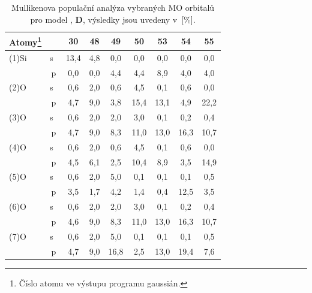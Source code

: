 \documentclass[
digital, %
table,   %
lof,     %
lot,     %
oneside,
]{fithesis3}
\begin{document}
\begin{table}[H]
\begin{minipage}{\textwidth}
\begin{center}
\caption{Mullikenova populační analýza vybraných MO orbitalů pro model , \textbf{D}, výsledky jsou uvedeny v~[\%].}
\begin{tabular}{|l|c|c|c|c|c|c|c|c|}
\hline
Atomy\footnote{Číslo atomu ve výstupu programu gaussián.}  \label{si_och3_6_MPA}&  & 30 & 48 & 49 & 50 & 53 & 54 & 55 \\ \hline
(1)Si & s~& 13,4  & 4,8  & 0,0  & 0,0  & 0,0  & 0,0  & 0,0  \\ \hline
& p & 0,0  & 0,0  & 4,4  & 4,4  & 8,9  & 4,0  & 4,0  \\ \hline
(2)O & s~& 0,6  & 2,0  & 0,6  & 4,5  & 0,1  & 0,6  & 0,0  \\ \hline
& p & 4,7  & 9,0  & 3,8  & 15,4  & 13,1  & 4,9  & 22,2  \\ \hline
(3)O & s~& 0,6  & 2,0  & 2,0  & 3,0  & 0,1  & 0,2  & 0,4  \\ \hline
& p & 4,7  & 9,0  & 8,3  & 11,0  & 13,0  & 16,3  & 10,7  \\ \hline
(4)O & s~& 0,6  & 2,0  & 0,6  & 4,5  & 0,1  & 0,6  & 0,0  \\ \hline
& p & 4,5  & 6,1  & 2,5  & 10,4  & 8,9  & 3,5  & 14,9  \\ \hline
(5)O & s~& 0,6  & 2,0  & 5,0  & 0,1  & 0,1  & 0,1  & 0,5  \\ \hline
& p & 3,5  & 1,7  & 4,2  & 1,4  & 0,4  & 12,5  & 3,5  \\ \hline
(6)O & s~& 0,6  & 2,0  & 2,0  & 3,0  & 0,1  & 0,2  & 0,4  \\ \hline
& p & 4,6  & 9,0  & 8,3  & 11,0  & 13,0  & 16,3  & 10,7  \\ \hline
(7)O & s~& 0,6  & 2,0  & 5,0  & 0,1  & 0,1  & 0,1  & 0,5  \\ \hline
& p & 4,7  & 9,0  & 16,8  & 2,5  & 13,0  & 19,4  & 7,6  \\ \hline
\end{tabular}\end{center}\end{minipage}\end{table}
\end{document}
